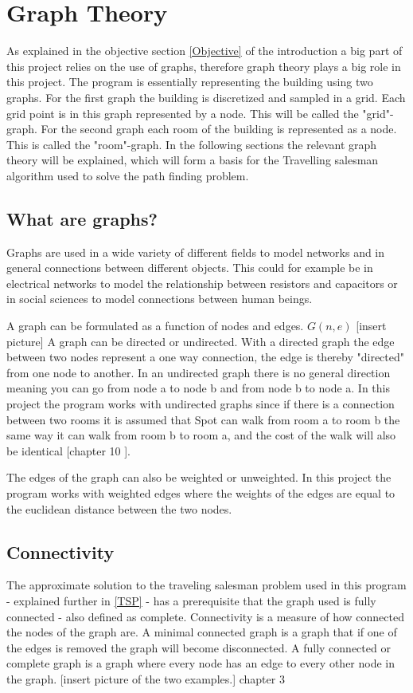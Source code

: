 \section{Graph Theory}
As explained in the objective section \ref{Objective} of the introduction a big part of this project relies on the use of graphs, therefore graph theory plays a big role in this project. 
The program is essentially representing the building using two graphs.%
For the first graph the building is discretized and sampled in a grid. Each grid point is in this graph represented by a node. This will be called the "grid"-graph.
For the second graph each room of the building is represented as a node. This is called the "room"-graph.
In the following sections the relevant graph theory will be explained, which will form a basis for the Travelling salesman algorithm used to solve the path finding problem.


\subsection{What are graphs?}
Graphs are used in a wide variety of different fields to model networks and in general connections between different objects. This could for example be in electrical networks to model the relationship between resistors and capacitors or in social sciences to model connections between human beings.

A graph can be formulated as a function of nodes and edges.
$G(n,e)$
[insert picture]
A graph can be directed or undirected. With a directed graph the edge between two nodes represent a one way connection, the edge is thereby "directed" from one node to another. In an undirected graph there is no general direction meaning you can go from node a to node b and from node b to node a. In this project the program works with undirected graphs since if there is a connection between two rooms it is assumed that Spot can walk from room a to room b the same way it can walk from room b to room a, and the cost of the walk will also be identical [chapter 10 \cite{bondy1976graph}].

The edges of the graph can also be weighted or unweighted. In this project the program works with weighted edges where the weights of the edges are equal to the euclidean distance between the two nodes.



\subsection{Connectivity}
The approximate solution to the traveling salesman problem used in this program - explained further in \ref{TSP} - has a prerequisite that the graph used is fully connected - also defined as complete.  
Connectivity is a measure of how connected the nodes of the graph are. A minimal connected graph is a graph that if one of the edges is removed the graph will become disconnected. A fully connected or complete graph is a graph where every node has an edge to every other node in the graph. [insert picture of the two examples.] chapter 3 \cite{bondy1976graph}


